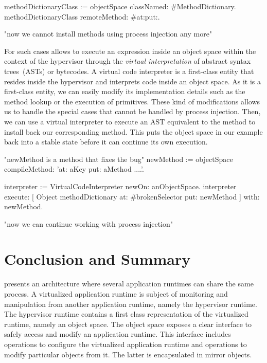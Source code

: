 \begin{code}
methodDictionaryClass := objectSpace classNamed: #MethodDictionary.
methodDictionaryClass remoteMethod: #at:put:.

"now we cannot install methods using process injection any more"
\end{code}

For such cases \Vtt allows to execute an expression inside an object space within the context of the hypervisor through the \emph{virtual interpretation} of \eg abstract syntax trees~(ASTs) or bytecodes. A virtual code interpreter is a first-class entity that resides inside the hypervisor and interprets code inside an object space. As it is a first-class entity, we can easily modify its implementation details such as the method lookup or the execution of primitives. These kind of modifications allows us to handle the special cases that cannot be handled by process injection. Then, we can use a virtual interpreter to execute an AST equivalent to the  method to install back our corresponding method. This puts the object space in our example back into a stable state before it can continue its own execution.

\begin{code}
"newMethod is a method that fixes the bug"
newMethod := objectSpace compileMethod: 'at: aKey put: aMethod ....'.

interpreter := VirtualCodeInterpreter newOn: anObjectSpace.
interpreter
	execute: [ Object methodDictionary at: #brokenSelector put: newMethod ]
	with: newMethod.
	
"now we can continue working with process injection"
\end{code}

\section{Conclusion and Summary}

\Vtt presents an architecture where several application runtimes can share the same process. A virtualized application runtime is subject of monitoring and manipulation from another application runtime, namely the hypervisor runtime. The hypervisor runtime contains a first class representation of the virtualized runtime, namely an object space. The object space exposes a clear interface to safely access and modify an application runtime. This interface includes operations to configure the virtualized application runtime and operations to modify particular objects from it. The latter is encapsulated in mirror objects.

